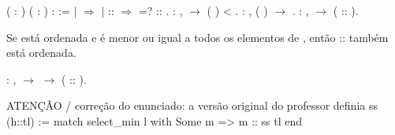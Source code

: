 \begin{coqdoccode}
\coqdocnoindent
{}  ( : ) ( :  ) :   :=\coqdoceol
\coqdocindent{1.00em}
  \coqdoceol
\coqdocindent{1.00em}
\ensuremath{|}  \ensuremath{\Rightarrow} \coqdoceol
\coqdocindent{1.00em}
\ensuremath{|}  ::  \ensuremath{\Rightarrow}   =?      ::   \coqdoceol
\coqdocindent{1.00em}
.\coqdoceol
\coqdocemptyline
\coqdocnoindent
{}  : \coqdockw{\ensuremath{\forall}}  ,    \ensuremath{\rightarrow}  (  ) <  .\coqdoceol
\coqdocemptyline
\coqdocnoindent
{}  : \coqdockw{\ensuremath{\forall}}   ,   (  ) \ensuremath{\rightarrow}   .\coqdoceol
\coqdocemptyline
\coqdocnoindent
{}  : \coqdockw{\ensuremath{\forall}}  ,    \ensuremath{\rightarrow}   ( ::   ).\coqdoceol
\coqdocemptyline
\coqdocemptyline
\end{coqdoccode}
Se  está ordenada e  é menor ou igual a todos os elementos de ,
    então :: também está ordenada. 
\begin{coqdoccode}
\coqdocnoindent
{}  : \coqdockw{\ensuremath{\forall}}  ,    \ensuremath{\rightarrow}    \ensuremath{\rightarrow}   ( :: ).\coqdoceol
\coqdocemptyline
\coqdocemptyline
\end{coqdoccode}
ATENÇÃO / correção do enunciado: a versão original do professor definia
        ss (h::tl) := match select\_min l with Some m => m :: ss tl end
